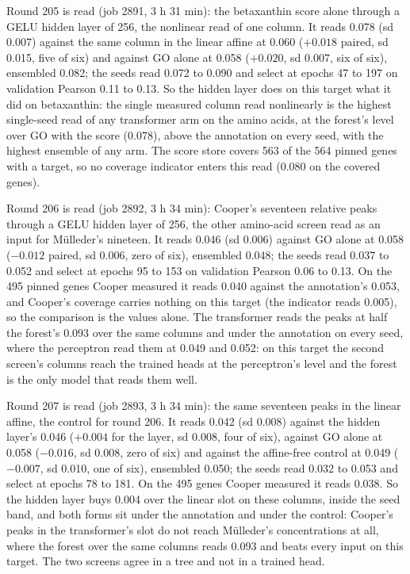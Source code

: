 Round 205 is read (job 2891, 3 h 31 min): the betaxanthin score alone through a GELU
hidden layer of 256, the nonlinear read of one column. It reads 0.078 (sd 0.007)
against the same column in the linear affine at 0.060 ($+0.018$ paired, sd 0.015, five
of six) and against GO alone at 0.058 ($+0.020$, sd 0.007, six of six), ensembled
0.082; the seeds read 0.072 to 0.090 and select at epochs 47 to 197 on validation
Pearson 0.11 to 0.13. So the hidden layer does on this target what it did on
betaxanthin: the single measured column read nonlinearly is the highest single-seed
read of any transformer arm on the amino acids, at the forest's level over GO with the
score (0.078), above the annotation on every seed, with the highest ensemble of any
arm. The score store covers 563 of the 564 pinned genes with a target, so no coverage
indicator enters this read (0.080 on the covered genes).

Round 206 is read (job 2892, 3 h 34 min): Cooper's seventeen relative peaks through a
GELU hidden layer of 256, the other amino-acid screen read as an input for
M\"ulleder's nineteen. It reads 0.046 (sd 0.006) against GO alone at 0.058
($-0.012$ paired, sd 0.006, zero of six), ensembled 0.048; the seeds read 0.037 to
0.052 and select at epochs 95 to 153 on validation Pearson 0.06 to 0.13. On the 495
pinned genes Cooper measured it reads 0.040 against the annotation's 0.053, and
Cooper's coverage carries nothing on this target (the indicator reads 0.005), so the
comparison is the values alone. The transformer reads the peaks at half the forest's
0.093 over the same columns and under the annotation on every seed, where the
perceptron read them at 0.049 and 0.052: on this target the second screen's columns
reach the trained heads at the perceptron's level and the forest is the only model that
reads them well.

Round 207 is read (job 2893, 3 h 34 min): the same seventeen peaks in the linear
affine, the control for round 206. It reads 0.042 (sd 0.008) against the hidden layer's
0.046 ($+0.004$ for the layer, sd 0.008, four of six), against GO alone at 0.058
($-0.016$, sd 0.008, zero of six) and against the affine-free control at 0.049
($-0.007$, sd 0.010, one of six), ensembled 0.050; the seeds read 0.032 to 0.053 and
select at epochs 78 to 181. On the 495 genes Cooper measured it reads 0.038. So the
hidden layer buys 0.004 over the linear slot on these columns, inside the seed band,
and both forms sit under the annotation and under the control: Cooper's peaks in the
transformer's slot do not reach M\"ulleder's concentrations at all, where the forest
over the same columns reads 0.093 and beats every input on this target. The two screens
agree in a tree and not in a trained head.

